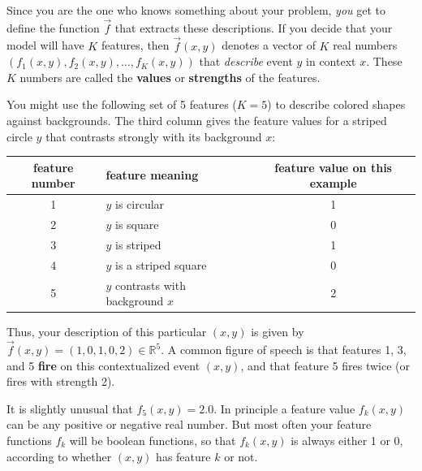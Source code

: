 \documentclass[11pt]{article}
\newcommand{\Real}{{\mathbb R}}
\begin{document}
Since you are the one who knows something about your problem, {\em
  you} get to define the function $\vec{f}$ that extracts these
descriptions.  If you decide that your model will have $K$ features,
then $\vec{f}(x,y)$ denotes a vector of $K$ real numbers $(f_1(x,y),
f_2(x,y), \ldots, f_K(x,y))$ that {\em describe} event $y$ in context
$x$.  These $K$ numbers are called the {\bf values} or {\bf strengths}
of the features.

\medskip

You might use the following set of 5 features ($K=5$) to describe
colored shapes against backgrounds.  The third column gives the
feature values for a striped circle $y$ that contrasts strongly with
its background $x$:

\smallskip
\begin{tabular}{|c|l|c|} \hline
feature number & feature meaning   & feature value on this example \\ \hline
1              & $y$ is circular   &    1 \\
2              & $y$ is square     &    0 \\
3              & $y$ is striped    &    1 \\
4              & $y$ is a striped square & 0 \\
5              & $y$ contrasts with background $x$ & 2 \\ \hline
\end{tabular}
\smallskip

\noindent Thus, your description of this particular $(x,y)$ is given by
$\vec{f}(x,y)=(1,0,1,0,2) \in \Real^5$.  A common figure of speech is
that features 1, 3, and 5 {\bf fire} on this contextualized event
$(x,y)$, and that feature 5 fires twice (or fires with strength 2).

% 

\medskip

It is slightly unusual that $f_5(x,y)=2.0$.  In principle a feature
value $f_k(x,y)$ can be any positive or negative real number.  But
most often your feature functions $f_k$ will be boolean functions, so
that $f_k(x,y)$ is always either 1 or 0, according to whether $(x,y)$
has feature $k$ or not.
\end{document}

